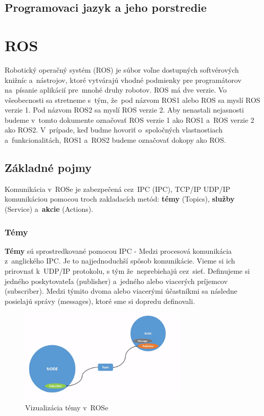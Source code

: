 \subsection{Programovaci jazyk a jeho porstredie}
\label{sec:programovaci_jazyk}



\section{ROS}
\label{sec:ros}

\noindent Robotický operačný systém (\acrlong{ROS}) je súbor voľne dostupných softvérových knižníc a~nástrojov, ktoré vytvárajú
vhodné podmienky pre programátorov na~písanie aplikácií pre~mnohé druhy robotov. ROS má dve verzie. Vo všeobecnosti sa stretneme
s~tým, že~pod názvom ROS1 alebo ROS sa myslí ROS verzie 1. Pod názvom ROS2 sa myslí ROS verzie 2. Aby nenastali nejasnosti
budeme v~tomto dokumente označovať ROS verzie 1 ako ROS1 a~ROS verzie 2 ako ROS2. V~prípade, keď budme hovoriť o~spoločných
vlastnostiach a~funkcionalitách, ROS1 a~ROS2 budeme označovať dokopy ako ROS.

\subsection{Základné pojmy}
\label{sec:zakladne_pojmy}

\noindent Komunikácia v~ROSe je zabezpečená cez~IPC (\acrlong{IPC}), TCP/IP UDP/IP komunikáciou pomocou troch zakladacích metód:
\textbf{témy} (Topics), \textbf{služby} (Service) a~\textbf{akcie} (Actions).

\subsubsection{Témy}
\label{sec:topic}

	\textbf {Témy} sú sprostredkované pomocou IPC - Medzi procesová komunikácia z~anglického \acrlong{IPC}. Je to najjednoduchší spôsob
	komunikácie. Vieme si ich prirovnať k~UDP/IP protokolu, s tým že~neprebiehajú cez~sieť. Definujeme si jedného poskytovateľa (publisher)
	a~jedného alebo viacerých príjemcov (subscriber). Medzi týmito dvoma alebo viacerými účastníkmi sa následne posielajú správy (messages),
	ktoré sme si dopredu definovali.

	\begin{figure}[h]
		\centering
		\includegraphics[width=8cm]{img/topicsExplanation.png}
		\caption{Vizualizácia témy v~ROSe~\cite{RosDoc}}
		\label{fig:topics}
	\end{figure}

